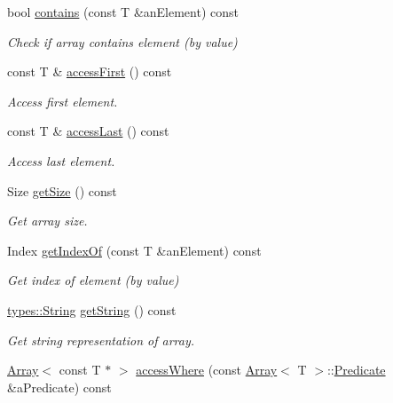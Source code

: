 \begin{DoxyCompactItemize}
bool \hyperlink{classlibrary_1_1core_1_1ctnr_1_1Array_a9c423eb8a34dddc81e0ede9435094e99}{contains} (const T \&an\+Element) const
\begin{DoxyCompactList}\small\item\em Check if array contains element (by value) \end{DoxyCompactList}\item 
const T \& \hyperlink{classlibrary_1_1core_1_1ctnr_1_1Array_afea012716d6cfffa2803606c0b244419}{access\+First} () const
\begin{DoxyCompactList}\small\item\em Access first element. \end{DoxyCompactList}\item 
const T \& \hyperlink{classlibrary_1_1core_1_1ctnr_1_1Array_ad95dcce8ddaf163903a2327f766dbc8a}{access\+Last} () const
\begin{DoxyCompactList}\small\item\em Access last element. \end{DoxyCompactList}\item 
Size \hyperlink{classlibrary_1_1core_1_1ctnr_1_1Array_a049307129c77f461b37ddca47edc7913}{get\+Size} () const
\begin{DoxyCompactList}\small\item\em Get array size. \end{DoxyCompactList}\item 
Index \hyperlink{classlibrary_1_1core_1_1ctnr_1_1Array_aa8a3e2745d72db8181b42e3cfb55415c}{get\+Index\+Of} (const T \&an\+Element) const
\begin{DoxyCompactList}\small\item\em Get index of element (by value) \end{DoxyCompactList}\item 
\hyperlink{classlibrary_1_1core_1_1types_1_1String}{types\+::\+String} \hyperlink{classlibrary_1_1core_1_1ctnr_1_1Array_a6a3416cc26d2968239af631d946ba11b}{get\+String} () const
\begin{DoxyCompactList}\small\item\em Get string representation of array. \end{DoxyCompactList}\item 
\hyperlink{classlibrary_1_1core_1_1ctnr_1_1Array}{Array}$<$ const T $\ast$ $>$ \hyperlink{classlibrary_1_1core_1_1ctnr_1_1Array_a5359c59d344a6147c7c6ea1012411011}{access\+Where} (const \hyperlink{classlibrary_1_1core_1_1ctnr_1_1Array}{Array}$<$ T $>$\+::\hyperlink{classlibrary_1_1core_1_1ctnr_1_1Array_a74cd325a740870aea490b6b739aa06ae}{Predicate} \&a\+Predicate) const

\end{DoxyCompactItemize}
